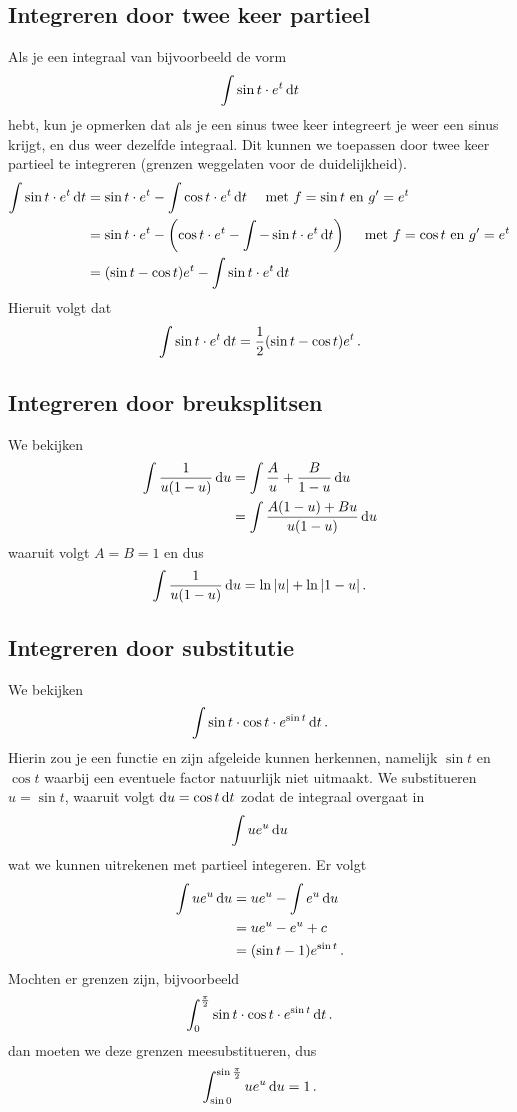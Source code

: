 \documentclass{article}
\begin{document}
        \subsection{Integreren door twee keer partieel}
            Als je een integraal van bijvoorbeeld de vorm
            \[
                \int \sin t \cdot e^t \mathop{}\!\mathrm{d} t
            \]
            hebt, kun je opmerken dat als je een sinus twee keer integreert je weer een sinus
            krijgt, en dus weer dezelfde integraal. Dit kunnen we toepassen
            door twee keer partieel te integreren (grenzen weggelaten voor de duidelijkheid).
            \begin{align*}
                \int \sin t \cdot e^t \mathop{}\!\mathrm{d} t &= \sin t \cdot e^t - \int \cos t \cdot e^t \mathop{}\!\mathrm{d} t
                \quad \text{ met $f=\sin t$ en $g'=e^t$} \\
                &= \sin t \cdot e^t - \left( \cos t \cdot e^t - \int - \sin t \cdot e^t \mathop{}\!\mathrm{d} t \right)
                \quad \text{ met $f=\cos t$ en $g'=e^t$} \\
                &= ( \sin t - \cos t ) e^t -  \int \sin t \cdot e^t \mathop{}\!\mathrm{d} t
            \end{align*}
            Hieruit volgt dat
            \[  \int \sin t \cdot e^t \mathop{}\!\mathrm{d} t = \frac{1}{2} ( \sin t - \cos t ) e^t\,. \]

        \subsection{Integreren door breuksplitsen}
            We bekijken
            \begin{align*}
                \int \frac{1}{u(1-u)} \mathop{}\!\mathrm{d} u &= \int \frac{A}{u} + \frac{B}{1-u} \mathop{}\!\mathrm{d} u \\
                &= \int \frac{A(1-u)+Bu}{u(1-u)} \mathop{}\!\mathrm{d} u
            \end{align*}
            waaruit volgt $A=B=1$ en dus
            \[ \int \frac{1}{u(1-u)} \mathop{}\!\mathrm{d} u = \ln |u| + \ln |1-u|\,. \]
        \subsection{Integreren door substitutie}
            We bekijken
            \[ \int \sin t \cdot \cos t \cdot e^{\sin t} \mathop{}\!\mathrm{d} t\,. \]
            Hierin zou je een functie en zijn afgeleide kunnen herkennen, namelijk
            $\sin t$ en $\cos t$ waarbij een eventuele factor natuurlijk niet uitmaakt.
            We substitueren $u = \sin t$, waaruit volgt $\mathop{}\!\mathrm{d} u = \cos t \mathop{}\!\mathrm{d} t$
            zodat de integraal overgaat in
            \[ \int u e^u \mathop{}\!\mathrm{d} u \]
            wat we kunnen uitrekenen met partieel integeren. Er volgt
            \begin{align*}
                \int u e^u \mathop{}\!\mathrm{d} u &= u e^u - \int e^u \mathop{}\!\mathrm{d} u \\
                &=  u e^u -  e^u + c \\
                &= (\sin t -1) e^{\sin t} \,.
            \end{align*}
            Mochten er grenzen zijn, bijvoorbeeld
            \[ \int_0^{\frac{\pi}{2}} \sin t \cdot \cos t \cdot e^{\sin t} \mathop{}\!\mathrm{d} t\,. \]
            dan moeten we deze grenzen meesubstitueren, dus
            \[ \int_{\sin 0}^{\sin \frac{\pi}{2}} u e^u \mathop{}\!\mathrm{d} u = 1\,. \]
\end{document}
